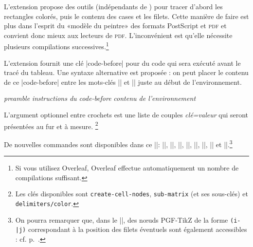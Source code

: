 \documentclass[dvipsnames]{article}%
\begin{document}
\label{color-in-code-before}

L'extension  propose des outils (indépendants de )
pour tracer d'abord les rectangles colorés, puis le contenu des cases et les
filets. Cette manière de faire est plus dans l'esprit du «modèle du peintre» des
formats PostScript et \textsc{pdf} et convient donc mieux aux lecteurs de
\textsc{pdf}. L'inconvénient est qu'elle nécessite plusieurs compilations
successives.\footnote{Si vous utilisez Overleaf, Overleaf effectue
  automatiquement un nombre de compilations suffisant.}

\medskip
L'extension  fournit une clé |code-before| pour du code qui sera
exécuté avant le tracé du tableau. Une syntaxe alternative est proposée : on
peut placer le contenu de ce |code-before| entre les mots-clés |\CodeBefore| et
|\Body| juste au début de l'environnement.

\smallskip
\begin{Code}
\begin{pNiceArray}{\textsl{preamble}}
\emph{}
  \textsl{instructions du code-before}
\emph{\Body}
  \textsl{contenu de l’environnement}
\end{pNiceArray}
\end{Code}

\smallskip
L'argument optionnel entre crochets est une liste de couples \textsl{clé=valeur}
qui seront présentées au fur et à mesure. \footnote{Les clés disponibles sont
  \texttt{create-cell-nodes}, \texttt{sub-matrix} (et ses sous-clés) et
  \texttt{delimiters/color}.}

\smallskip
De nouvelles commandes sont disponibles dans ce |\CodeBefore|: |\cellcolor|,
|\rectanglecolor|, |\rowcolor|, |\columncolor|, |\rowcolors|, |\rowlistcolors|,
|\chessboardcolors| et |\arraycolor|.\footnote{On pourra remarquer que, dans le
  |\CodeBefore|, des nœuds PGF-TikZ de la forme \verb+(i-|j)+ correspondant à la
  position des filets éventuels sont également accessibles : cf.
  p.~\pageref{nodes-i}.}
\label{code-before}
\end{document}
